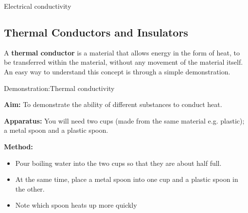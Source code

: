 \begin{iexperiment}{Electrical conductivity}
            \subsection{ Thermal Conductors and Insulators}
            \nopagebreak
      \label{m38706*id66527}A \textbf{thermal conductor} is a material that allows energy in the form of heat, to be transferred within the material, without any movement of the material itself. An easy way to understand this concept is through a simple demonstration.\par 
\label{m38706*secfhsst!!!underscore!!!id453}
            \begin{gexperiment}{Demonstration:Thermal conductivity}{
            \nopagebreak
            \label{m38706*id66568}\noindent{}\textbf{Aim: }\newline
    To demonstrate the ability of different substances to conduct heat.\par 
      \label{m38706*id66588}\noindent{}\textbf{Apparatus: }\newline
    You will need two cups (made from the same material e.g. plastic); a metal spoon and a plastic spoon.\par 
      \label{m38706*id66592}\noindent{}\textbf{Method: }
      \label{m38706*id66609}\begin{itemize}[noitemsep]
            \label{m38706*uid102}\item Pour boiling water into the two cups so that they are about half full.
\label{m38706*uid103}\item At the same time, place a metal spoon into one cup and a plastic spoon in the other.
\label{m38706*uid104}\item Note which spoon heats up more quickly
\end{itemize}
        \par 
\label{m38706*eip-270}
	\par
}
\end{gexperiment}
\end{iexperiment}

